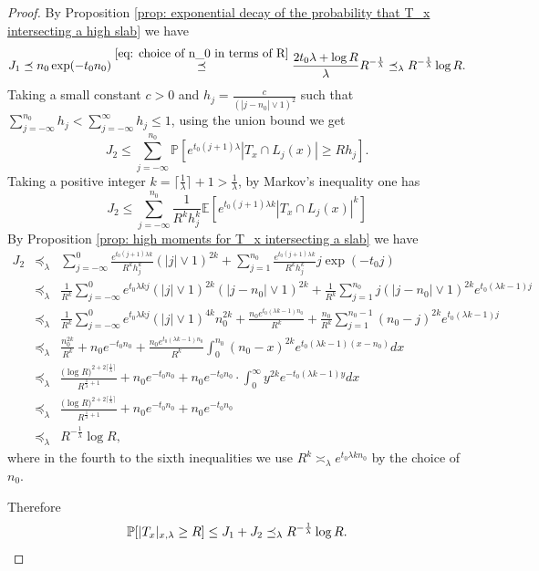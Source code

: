 \documentclass[12pt]{article}
\numberwithin{equation}{section}
\newcommand{\be}{\begin{equation}}
\newcommand{\ee}{\end{equation}}
\newcommand{\1}{\mathbf{1}}
\begin{document}
\begin{proof}
 		By  Proposition \ref{prop: exponential decay of the probability that T_x intersecting a high slab}
 		we have 
 		\be
 		J_1\preceq  n_0\exp(-t_0n_0)\stackrel{\eqref{eq: choice of n_0 in terms of R} }{\preceq} \frac{2t_0\lambda+\log R}{\lambda} R^{-\frac{1}{\lambda}}\preceq_\lambda R^{-\frac{1}{\lambda}}\log R.
 		\ee
 		Taking a small constant $c>0$ and $h_j=\frac{c}{(|j-n_0|\vee 1)^2}$ such that $\sum_{j=-\infty}^{n_0}h_j<\sum_{j=-\infty}^{\infty}h_j\leq 1$, using the union bound we get
 		\be
 		J_2\leq \sum_{j=-\infty}^{n_0}\mathbb{P}[e^{t_0(j+1)\lambda}|T_x\cap L_j(x)|\geq Rh_j].
 		\ee
 		Taking a positive integer $k=\lceil\frac{1}{\lambda}\rceil+1>\frac{1}{\lambda}$, by Markov's inequality one has 
 		\be
 		J_2\leq \sum_{j=-\infty}^{n_0}\frac{1}{R^kh_j^k}\mathbb{E}[e^{t_0(j+1)\lambda k}|T_x\cap L_j(x)|^k]
 		\ee
 		By Proposition \ref{prop: high moments for T_x intersecting a slab} we have 
 		\begin{eqnarray}
 		J_2&\preceq_\lambda&\sum_{j=-\infty}^{0}\frac{e^{t_0(j+1)\lambda k}}{R^kh_j^k}(|j|\vee1)^{2k}+\sum_{j=1}^{n_0}\frac{e^{t_0(j+1)\lambda k}}{R^kh_j^k}j\exp(-t_0j)\nonumber\\
 		&\preceq_\lambda&\frac{1}{R^k}\sum_{j=-\infty}^{0}e^{t_0\lambda kj}(|j|\vee1)^{2k}(|j-n_0|\vee1)^{2k}+\frac{1}{R^k}\sum_{j=1}^{n_0}j(|j-n_0|\vee1)^{2k}e^{t_0(\lambda k-1)j}\nonumber\\
 		&\preceq_\lambda&\frac{1}{R^k}\sum_{j=-\infty}^{0}e^{t_0\lambda kj}(|j|\vee1)^{4k}n_0^{2k}+\frac{n_0e^{t_0(\lambda k-1)n_0}}{R^k}+\frac{n_0}{R^k}\sum_{j=1}^{n_0-1}(n_0-j)^{2k}e^{t_0(\lambda k-1)j}\nonumber\\
 		&\preceq_\lambda&\frac{n_0^{2k}}{R^k}+n_0e^{-t_0n_0}+\frac{n_0e^{t_0(\lambda k-1)n_0}}{R^k}\int_{0}^{n_0}(n_0-x)^{2k}e^{t_0(\lambda k-1)(x-n_0)}dx\nonumber\\
 		&\preceq_\lambda&\frac{\big(\log R\big)^{2+2\lceil \frac{1}{\lambda}\rceil}}{R^{\frac{1}{\lambda}+1}}+n_0e^{-t_0n_0}+n_0e^{-t_0n_0}\cdot
 		\int_{0}^{\infty}y^{2k}e^{-t_0(\lambda k-1)y}dx
 		 \nonumber\\
 		&\preceq_\lambda&\frac{\big(\log R\big)^{2+2\lceil \frac{1}{\lambda}\rceil}}{R^{\frac{1}{\lambda}+1}}+n_0e^{-t_0n_0}+n_0e^{-t_0n_0}\nonumber\\
 			&\preceq_\lambda& R^{-\frac{1}{\lambda}}\log R,
 		\end{eqnarray}	
 		where in the fourth to the sixth inequalities we use $R^k\asymp_\lambda e^{t_0\lambda kn_0}$ by the choice of $n_0$.
 		
 		
 		Therefore 
 		\[
 		\mathbb{P}[|T_x|_{x,\lambda}\geq R]\leq J_1+J_2\preceq_\lambda R^{-\frac{1}{\lambda}}\log R.\qedhere
 		\]
	
 \end{proof}
 
\end{document}
